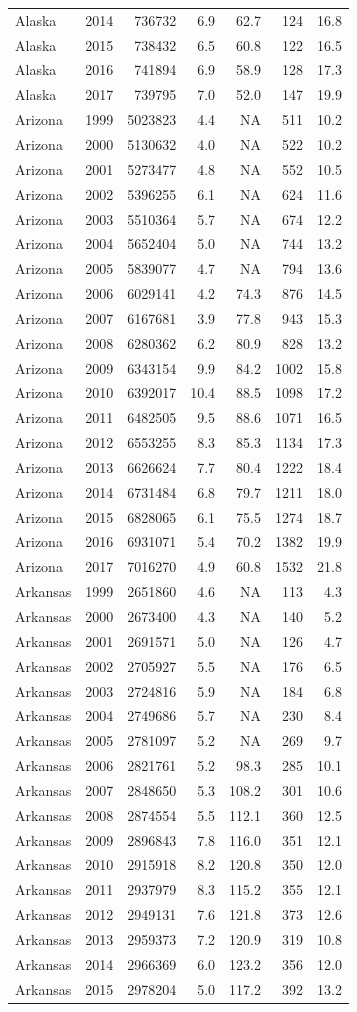 \documentclass[
]{article}
\begin{document}
\begin{longtable}[]{@{}lrrrrrr@{}}
Alaska & 2014 & 736732 & 6.9 & 62.7 & 124 & 16.8\tabularnewline
Alaska & 2015 & 738432 & 6.5 & 60.8 & 122 & 16.5\tabularnewline
Alaska & 2016 & 741894 & 6.9 & 58.9 & 128 & 17.3\tabularnewline
Alaska & 2017 & 739795 & 7.0 & 52.0 & 147 & 19.9\tabularnewline
Arizona & 1999 & 5023823 & 4.4 & NA & 511 & 10.2\tabularnewline
Arizona & 2000 & 5130632 & 4.0 & NA & 522 & 10.2\tabularnewline
Arizona & 2001 & 5273477 & 4.8 & NA & 552 & 10.5\tabularnewline
Arizona & 2002 & 5396255 & 6.1 & NA & 624 & 11.6\tabularnewline
Arizona & 2003 & 5510364 & 5.7 & NA & 674 & 12.2\tabularnewline
Arizona & 2004 & 5652404 & 5.0 & NA & 744 & 13.2\tabularnewline
Arizona & 2005 & 5839077 & 4.7 & NA & 794 & 13.6\tabularnewline
Arizona & 2006 & 6029141 & 4.2 & 74.3 & 876 & 14.5\tabularnewline
Arizona & 2007 & 6167681 & 3.9 & 77.8 & 943 & 15.3\tabularnewline
Arizona & 2008 & 6280362 & 6.2 & 80.9 & 828 & 13.2\tabularnewline
Arizona & 2009 & 6343154 & 9.9 & 84.2 & 1002 & 15.8\tabularnewline
Arizona & 2010 & 6392017 & 10.4 & 88.5 & 1098 & 17.2\tabularnewline
Arizona & 2011 & 6482505 & 9.5 & 88.6 & 1071 & 16.5\tabularnewline
Arizona & 2012 & 6553255 & 8.3 & 85.3 & 1134 & 17.3\tabularnewline
Arizona & 2013 & 6626624 & 7.7 & 80.4 & 1222 & 18.4\tabularnewline
Arizona & 2014 & 6731484 & 6.8 & 79.7 & 1211 & 18.0\tabularnewline
Arizona & 2015 & 6828065 & 6.1 & 75.5 & 1274 & 18.7\tabularnewline
Arizona & 2016 & 6931071 & 5.4 & 70.2 & 1382 & 19.9\tabularnewline
Arizona & 2017 & 7016270 & 4.9 & 60.8 & 1532 & 21.8\tabularnewline
Arkansas & 1999 & 2651860 & 4.6 & NA & 113 & 4.3\tabularnewline
Arkansas & 2000 & 2673400 & 4.3 & NA & 140 & 5.2\tabularnewline
Arkansas & 2001 & 2691571 & 5.0 & NA & 126 & 4.7\tabularnewline
Arkansas & 2002 & 2705927 & 5.5 & NA & 176 & 6.5\tabularnewline
Arkansas & 2003 & 2724816 & 5.9 & NA & 184 & 6.8\tabularnewline
Arkansas & 2004 & 2749686 & 5.7 & NA & 230 & 8.4\tabularnewline
Arkansas & 2005 & 2781097 & 5.2 & NA & 269 & 9.7\tabularnewline
Arkansas & 2006 & 2821761 & 5.2 & 98.3 & 285 & 10.1\tabularnewline
Arkansas & 2007 & 2848650 & 5.3 & 108.2 & 301 & 10.6\tabularnewline
Arkansas & 2008 & 2874554 & 5.5 & 112.1 & 360 & 12.5\tabularnewline
Arkansas & 2009 & 2896843 & 7.8 & 116.0 & 351 & 12.1\tabularnewline
Arkansas & 2010 & 2915918 & 8.2 & 120.8 & 350 & 12.0\tabularnewline
Arkansas & 2011 & 2937979 & 8.3 & 115.2 & 355 & 12.1\tabularnewline
Arkansas & 2012 & 2949131 & 7.6 & 121.8 & 373 & 12.6\tabularnewline
Arkansas & 2013 & 2959373 & 7.2 & 120.9 & 319 & 10.8\tabularnewline
Arkansas & 2014 & 2966369 & 6.0 & 123.2 & 356 & 12.0\tabularnewline
Arkansas & 2015 & 2978204 & 5.0 & 117.2 & 392 & 13.2\tabularnewline

\end{longtable}
\end{document}
